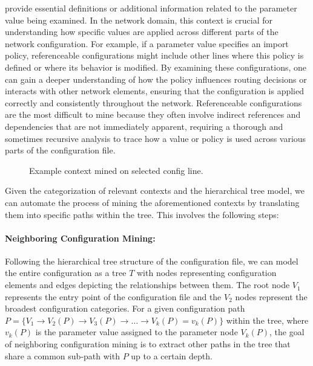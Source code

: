     provide essential definitions or additional information related to the parameter value being examined. In the network domain, this context is crucial for understanding how specific values are applied across different parts of the network configuration. For example, if a parameter value specifies an import policy, referenceable configurations might include other lines where this policy is defined or where its behavior is modified. By examining these configurations, one can gain a deeper understanding of how the policy influences routing decisions or interacts with other network elements, ensuring that the configuration is applied correctly and consistently throughout the network.
    Referenceable configurations are the most difficult to mine because they often involve indirect references and dependencies that are not immediately apparent, requiring a thorough and sometimes recursive analysis to trace how a value or policy is used across various parts of the configuration file.

\begin{figure}[t]
    \centering
    \caption{Example context mined on selected config line.}
    \label{fig:context_mine}
\end{figure}

Given the categorization of relevant contexts and the hierarchical tree model, we can automate the process of mining the aforementioned contexts by translating them into specific paths within the tree. This involves the following steps:

\paragraph{Neighboring Configuration Mining:}
    Following the hierarchical tree structure of the configuration file, we can model the entire configuration as a tree \( T \) with nodes representing configuration elements and edges depicting the relationships between them. The root node \(V_1\) represents the entry point of the configuration file and the \(V_2\) nodes represent the broadest configuration categories.
    For a given configuration path \( P = \{ V_1 \rightarrow V_2(P) \rightarrow V_3(P) \rightarrow \dots \rightarrow V_k(P) = v_k(P) \} \) within the tree, where \( v_k(P) \) is the parameter value assigned to the parameter node \( V_k(P) \), the goal of neighboring configuration mining is to extract other paths in the tree that share a common sub-path with \( P \) up to a certain depth. 
    
